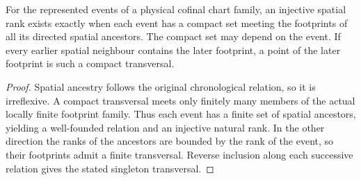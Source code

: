 \begin{proposition}
\label{hir:g8-spatial-ancestry-compact-transversals}
\leanok
For the represented events of a physical cofinal chart family, an
injective spatial rank exists exactly when each event has a compact
set meeting the footprints of all its directed spatial ancestors.
The compact set may depend on the event. If every earlier spatial
neighbour contains the later footprint, a point of the later
footprint is such a compact transversal.
\end{proposition}
\begin{proof}
Spatial ancestry follows the original chronological relation, so
it is irreflexive. A compact transversal meets only finitely many
members of the actual locally finite footprint family. Thus each
event has a finite set of spatial ancestors, yielding a well-founded
relation and an injective natural rank. In the other direction the
ranks of the ancestors are bounded by the rank of the event, so their
footprints admit a finite transversal. Reverse inclusion along each
successive relation gives the stated singleton transversal.
\end{proof}


